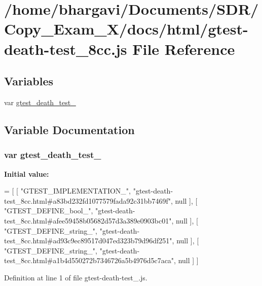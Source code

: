 \hypertarget{gtest-death-test__8cc_8js}{}\section{/home/bhargavi/\+Documents/\+S\+D\+R/\+Copy\+\_\+\+Exam\+\_\+X/docs/html/gtest-\/death-\/test\+\_\+8cc.js File Reference}
\label{gtest-death-test__8cc_8js}
\subsection*{Variables}
\begin{DoxyCompactItemize}
\item 
var \hyperlink{gtest-death-test__8cc_8js_a409020231ba1c51c28473e09c18d5d5f}{gtest\+\_\+death\+\_\+test\+\_}
\end{DoxyCompactItemize}


\subsection{Variable Documentation}
\subsubsection[{\texorpdfstring{gtest\+\_\+death\+\_\+test\+\_\+8cc}{gtest_death_test_8cc}}]{\setlength{\rightskip}{0pt plus 5cm}var gtest\+\_\+death\+\_\+test\+\_}\hypertarget{gtest-death-test__8cc_8js_a409020231ba1c51c28473e09c18d5d5f}{}\label{gtest-death-test__8cc_8js_a409020231ba1c51c28473e09c18d5d5f}
{\bfseries Initial value\+:}
\begin{DoxyCode}
=
[
    [ \textcolor{stringliteral}{"GTEST\_IMPLEMENTATION\_"}, \textcolor{stringliteral}{"gtest-death-test\_8cc.html#a83bd232fd1077579fada92c31bb7469f"}, null ],
    [ \textcolor{stringliteral}{"GTEST\_DEFINE\_bool\_"}, \textcolor{stringliteral}{"gtest-death-test\_8cc.html#afee59458b05682d57d3a389e0903bc01"}, null ],
    [ \textcolor{stringliteral}{"GTEST\_DEFINE\_string\_"}, \textcolor{stringliteral}{"gtest-death-test\_8cc.html#ad93c9ec89517d047ed323b79d96df251"}, null ],
    [ \textcolor{stringliteral}{"GTEST\_DEFINE\_string\_"}, \textcolor{stringliteral}{"gtest-death-test\_8cc.html#a1b4d550272b7346726a5b4976d5c7aca"}, null ]
]
\end{DoxyCode}


Definition at line 1 of file gtest-\/death-\/test\+\_.\+js.

